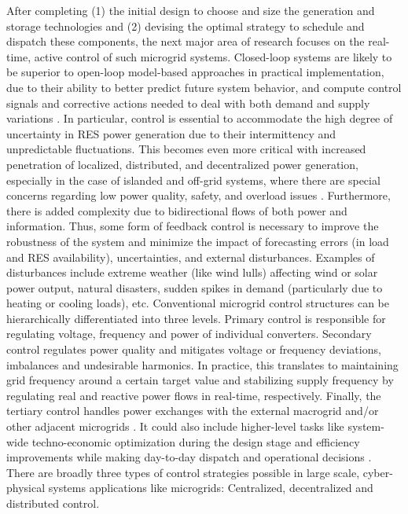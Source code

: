 \documentclass[final,3p,times]{elsarticle}
\begin{document}
After completing (1) the initial design to choose and size the generation and storage technologies and (2) devising the optimal strategy to schedule and dispatch these components, the next major area of research focuses on the real-time, active control of such microgrid systems. Closed-loop systems are likely to be superior to open-loop model-based approaches in practical implementation, due to their ability to better predict future system behavior, and compute control signals and corrective actions needed to deal with both demand and supply variations \cite{tazvinga2014}. In particular, control is essential to accommodate the high degree of uncertainty in RES power generation due to their intermittency and unpredictable fluctuations. This becomes even more critical with increased penetration of localized, distributed, and decentralized power generation, especially in the case of islanded and off-grid systems, where there are special concerns regarding low power quality, safety, and overload issues \cite{pourbabak2017}. Furthermore, there is added complexity due to bidirectional flows of both power and information. Thus, some form of feedback control is necessary to improve the robustness of the system and minimize the impact of forecasting errors (in load and RES availability), uncertainties, and external disturbances. Examples of disturbances include extreme weather (like wind lulls) affecting wind or solar power output, natural disasters, sudden spikes in demand (particularly due to heating or cooling loads), etc. Conventional microgrid control structures can be hierarchically differentiated into three levels. Primary control is responsible for regulating voltage, frequency and power of individual converters. Secondary control regulates power quality and mitigates voltage or frequency deviations, imbalances and undesirable harmonics. In practice, this translates to maintaining grid frequency around a certain target value and stabilizing supply frequency by regulating real and reactive power flows in real-time, respectively. Finally, the tertiary control handles power exchanges with the external macrogrid and/or other adjacent microgrids \cite{dragicevic_2017}. It could also include higher-level tasks like system-wide techno-economic optimization during the design stage and efficiency improvements while making day-to-day dispatch and operational decisions \cite{mg_review}. There are broadly three types of control strategies possible in large scale, cyber-physical systems applications like microgrids: Centralized, decentralized and distributed control.
\end{document}
